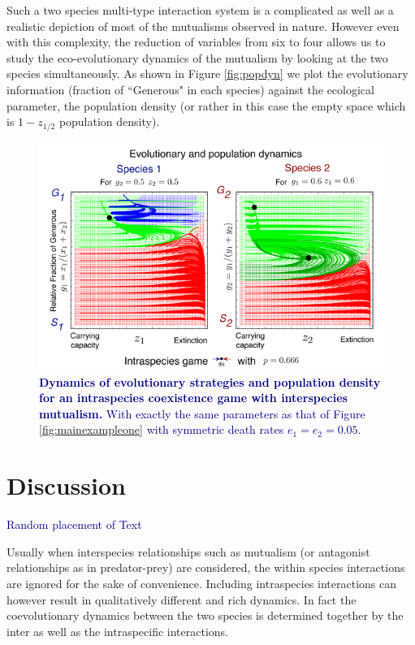 \documentclass[12pt]{article}
\newcommand{\cha}[1]{\textcolor{darkblue}{#1}}
\begin{document}
Such a two species multi-type interaction system is a complicated as well as a realistic depiction of most of the mutualisms observed in nature.
However even with this complexity, the reduction of variables from six to four allows us to study the eco-evolutionary dynamics of the mutualism by looking at the two species simultaneously.
As shown in Figure \ref{fig:popdyn} we plot the evolutionary information (fraction of ``Generous" in each species) against the ecological parameter, the population density (or rather in this case the empty space which is $1-z_{1/2}$ population density).

\begin{figure}
\begin{center}
\includegraphics[width=\columnwidth]{../Figures/mainexamplepopdyn2.pdf}
\caption{
\cha{\textbf{Dynamics of evolutionary strategies and population density for an intraspecies coexistence game with interspecies mutualism.}
With exactly the same parameters as that of Figure \ref{fig:mainexampleone} with  symmetric death rates $e_1 = e_2 = 0.05$.
}
}
\end{center}
\end{figure}




\section{Discussion}


\cha{Random placement of Text}

Usually when interspecies relationships such as mutualism (or antagonist relationships as in predator-prey) are considered, the within species interactions are ignored for the sake of convenience. Including intraspecies interactions can however result in qualitatively different and rich dynamics.
In fact the coevolutionary dynamics between the two species is determined together by the inter as well as the intraspecific interactions.
\end{document}

